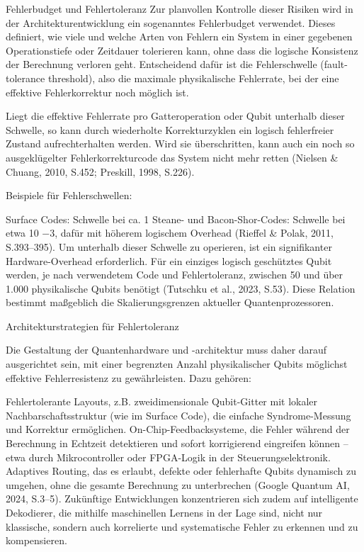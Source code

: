 Fehlerbudget und Fehlertoleranz
Zur planvollen Kontrolle dieser Risiken wird in der Architekturentwicklung ein sogenanntes Fehlerbudget verwendet. Dieses definiert, wie viele und welche Arten von Fehlern ein System in einer gegebenen Operationstiefe oder Zeitdauer tolerieren kann, ohne dass die logische Konsistenz der Berechnung verloren geht. Entscheidend dafür ist die Fehlerschwelle (fault-tolerance threshold), also die maximale physikalische Fehlerrate, bei der eine effektive Fehlerkorrektur noch möglich ist.

Liegt die effektive Fehlerrate pro Gatteroperation oder Qubit unterhalb dieser Schwelle, so kann durch wiederholte Korrekturzyklen ein logisch fehlerfreier Zustand aufrechterhalten werden. Wird sie überschritten, kann auch ein noch so ausgeklügelter Fehlerkorrekturcode das System nicht mehr retten (Nielsen & Chuang, 2010, S.452; Preskill, 1998, S.226).

Beispiele für Fehlerschwellen:

Surface Codes: Schwelle bei ca. 1%
Steane- und Bacon-Shor-Codes: Schwelle bei etwa 10 −3, dafür mit höherem logischem Overhead (Rieffel & Polak, 2011, S.393–395).
Um unterhalb dieser Schwelle zu operieren, ist ein signifikanter Hardware-Overhead erforderlich. Für ein einziges logisch geschütztes Qubit werden, je nach verwendetem Code und Fehlertoleranz, zwischen 50 und über 1.000 physikalische Qubits benötigt (Tutschku et al., 2023, S.53). Diese Relation bestimmt maßgeblich die Skalierungsgrenzen aktueller Quantenprozessoren.

Architekturstrategien für Fehlertoleranz

Die Gestaltung der Quantenhardware und -architektur muss daher darauf ausgerichtet sein, mit einer begrenzten Anzahl physikalischer Qubits möglichst effektive Fehlerresistenz zu gewährleisten. Dazu gehören:

Fehlertolerante Layouts, z.B. zweidimensionale Qubit-Gitter mit lokaler Nachbarschaftsstruktur (wie im Surface Code), die einfache Syndrome-Messung und Korrektur ermöglichen.
On-Chip-Feedbacksysteme, die Fehler während der Berechnung in Echtzeit detektieren und sofort korrigierend eingreifen können – etwa durch Mikrocontroller oder FPGA-Logik in der Steuerungselektronik.
Adaptives Routing, das es erlaubt, defekte oder fehlerhafte Qubits dynamisch zu umgehen, ohne die gesamte Berechnung zu unterbrechen (Google Quantum AI, 2024, S.3–5).
Zukünftige Entwicklungen konzentrieren sich zudem auf intelligente Dekodierer, die mithilfe maschinellen Lernens in der Lage sind, nicht nur klassische, sondern auch korrelierte und systematische Fehler zu erkennen und zu kompensieren.



